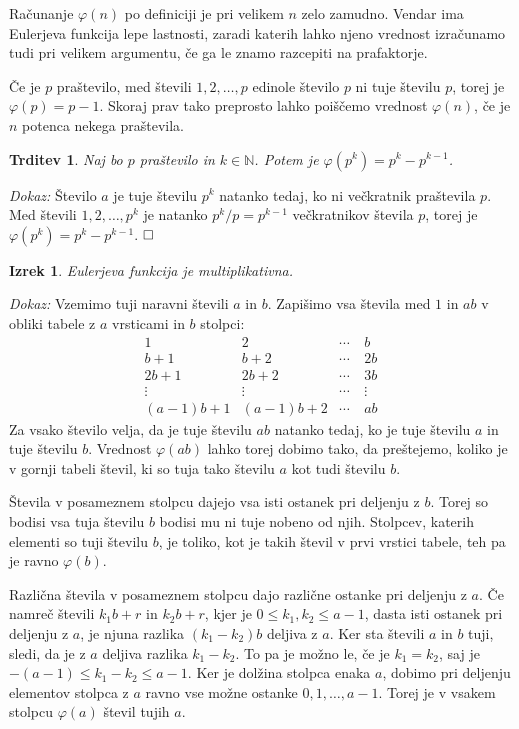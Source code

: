 \documentclass[a4paper,12pt]{article}
\def\N{\mathbb{N}} %
\def\qed{$\hfill\Box$}   %
\newtheorem{izrek}{Izrek}
\newtheorem{trditev}{Trditev}
\begin{document}
Računanje $\varphi(n)$ po definiciji je pri velikem $n$ zelo zamudno. Vendar ima 
Eulerjeva funkcija lepe lastnosti, zaradi katerih lahko njeno vrednost izračunamo
tudi pri velikem argumentu, če ga le znamo razcepiti na prafaktorje.

Če je $p$ praštevilo, med števili $1,2,\ldots, p$ edinole število $p$ ni tuje številu $p$,
torej je $\varphi(p) = p-1$. Skoraj prav tako preprosto lahko poiščemo vrednost $\varphi(n)$,
če je $n$ potenca nekega praštevila.

\begin{trditev}
\label{fipp}
Naj bo $p$ praštevilo in $k \in \N$. Potem je $\varphi(p^k) = p^k-p^{k-1}$.
\end{trditev}

\noindent
{\em Dokaz:\/} Število $a$ je tuje številu $p^k$ natanko tedaj, ko ni večkratnik praštevila $p$.
Med števili $1,2,\ldots, p^k$ je natanko $p^k/p = p^{k-1}$ večkratnikov števila $p$, torej je $\varphi(p^k) = p^k-p^{k-1}$. 
\qed

\begin{izrek}
\label{fimult}
Eulerjeva funkcija je multiplikativna.
\end{izrek}

\noindent
{\em Dokaz:\/} Vzemimo tuji naravni števili $a$ in $b$. Zapišimo vsa števila med $1$ in $ab$
v obliki tabele z $a$ vrsticami in $b$ stolpci:
\[
\begin{array}{cccc}
1 & 2 & \cdots & \ b \\
b+1 & b+2 & \cdots & \ 2b \\
2b+1 & 2b+2 & \cdots & \ 3b \\
\vdots & \vdots & \cdots & \ \vdots \\
(a-1)b+1 & (a-1)b+2 & \cdots & \ ab 
\end{array}
\]
Za vsako število velja, da je tuje številu $ab$ natanko tedaj, ko je tuje številu $a$ in tuje številu $b$.
Vrednost $\varphi(ab)$ lahko torej dobimo tako, da preštejemo, koliko je v gornji tabeli števil, ki so tuja
tako številu $a$ kot tudi številu $b$. 

Števila v posameznem stolpcu dajejo vsa isti ostanek pri deljenju z $b$. Torej so bodisi vsa tuja številu
$b$ bodisi mu ni tuje nobeno od njih. Stolpcev, katerih elementi so tuji številu $b$, je toliko, kot je
takih števil v prvi vrstici tabele, teh pa je ravno $\varphi(b)$.

Različna števila v posameznem stolpcu dajo različne ostanke pri deljenju z $a$. Če namreč števili
$k_1 b + r$ in $k_2 b + r$, kjer je $0 \le k_1, k_2 \le a-1$, dasta isti ostanek pri deljenju z $a$, je njuna razlika $(k_1 - k_2) b$
deljiva z $a$. Ker sta števili $a$ in $b$ tuji, sledi, da je z $a$ deljiva razlika $k_1 - k_2$.
To pa je možno le, če je $k_1 = k_2$, saj je $-(a-1) \le k_1 - k_2 \le a-1$. Ker je dolžina stolpca
enaka $a$, dobimo pri deljenju elementov stolpca z $a$ ravno vse možne ostanke $0, 1,\ldots, a-1$.
Torej je v vsakem stolpcu $\varphi(a)$ števil tujih $a$. 
\end{document}
